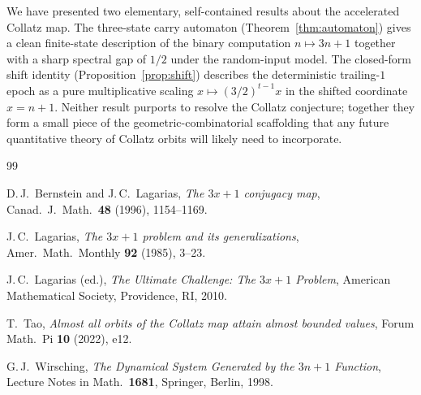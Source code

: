 \documentclass[11pt,a4paper]{article}
\theoremstyle{definition}
\theoremstyle{remark}
\begin{document}
We have presented two elementary, self-contained results about the
accelerated Collatz map.  The three-state carry automaton
(Theorem~\ref{thm:automaton}) gives a clean finite-state description of
the binary computation $n \mapsto 3n + 1$ together with a sharp spectral
gap of $1/2$ under the random-input model.  The closed-form shift
identity (Proposition~\ref{prop:shift}) describes the deterministic
trailing-$1$ epoch as a pure multiplicative scaling
$x \mapsto (3/2)^{t-1} x$ in the shifted coordinate $x = n + 1$.
Neither result purports to resolve the Collatz conjecture; together
they form a small piece of the geometric-combinatorial scaffolding that
any future quantitative theory of Collatz orbits will likely need to
incorporate.

\begin{thebibliography}{99}

D.\,J.~Bernstein and J.\,C.~Lagarias,
\emph{The $3x+1$ conjugacy map},
Canad.\ J.\ Math.\ \textbf{48} (1996), 1154--1169.

J.\,C.~Lagarias,
\emph{The $3x+1$ problem and its generalizations},
Amer.\ Math.\ Monthly \textbf{92} (1985), 3--23.

J.\,C.~Lagarias (ed.),
\emph{The Ultimate Challenge: The $3x+1$ Problem},
American Mathematical Society, Providence, RI, 2010.

T.~Tao,
\emph{Almost all orbits of the Collatz map attain almost bounded values},
Forum Math.\ Pi \textbf{10} (2022), e12.

G.\,J.~Wirsching,
\emph{The Dynamical System Generated by the $3n+1$ Function},
Lecture Notes in Math.\ \textbf{1681}, Springer, Berlin, 1998.

\end{thebibliography}
\end{document}
